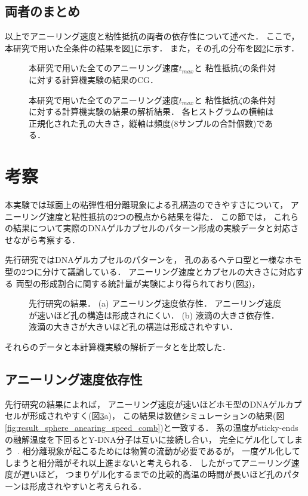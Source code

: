 \subsection{両者のまとめ}
以上でアニーリング速度と粘性抵抗の両者の依存性について述べた．
ここで，本研究で用いた全条件の結果を図\ref{fig:result_sphere_all}に示す．
また，その孔の分布を図\ref{fig:result_sphere_all_hist}に示す．
\begin{figure}
    \centering
    
    \caption{
        本研究で用いた全てのアニーリング速度$t_{max}$と
        粘性抵抗$\zeta$の条件対に対する計算機実験の結果のCG．
    }
\label{fig:result_sphere_all}
\end{figure}
\begin{figure}
    \centering
    
    \caption{
        本研究で用いた全てのアニーリング速度$t_{max}$と
        粘性抵抗$\zeta$の条件対に対する計算機実験の結果の解析結果．
        各ヒストグラムの横軸は正規化された孔の大きさ，縦軸は頻度(8サンプルの合計個数)である．
    }
    \label{fig:result_sphere_all_hist}
\end{figure}


\section{考察}
本実験では球面上の粘弾性相分離現象による孔構造のできやすさについて，
アニーリング速度と粘性抵抗の2つの観点から結果を得た．
この節では，
これらの結果について実際のDNAゲルカプセルのパターン形成の実験データと対応させながら考察する．

先行研究ではDNAゲルカプセルのパターンを，
孔のあるヘテロ型と一様なホモ型の2つに分けて議論している．
アニーリング速度とカプセルの大きさに対応する
両型の形成割合に関する統計量が実験により得られており(図\ref{fig:result_moritasan})，
\begin{figure}
    \centering
    
    \caption{
        先行研究の結果\cite{moritasan}．
        (a) アニーリング速度依存性．
            アニーリング速度が速いほど孔の構造は形成されにくい．
        (b) 液滴の大きさ依存性．
            液滴の大きさが大きいほど孔の構造は形成されやすい．
    }
    \label{fig:result_moritasan}
\end{figure}
それらのデータと本計算機実験の解析データとを比較した．


\subsection{アニーリング速度依存性}
先行研究の結果によれば，
アニーリング速度が速いほどホモ型のDNAゲルカプセルが形成されやすく(図\ref{fig:result_moritasan}a)，
この結果は数値シミュレーションの結果(図\ref{fig:result_sphere_anearing_speed_comb})と一致する．
系の温度がsticky-endsの融解温度を下回るとY-DNA分子は互いに接続し合い，
完全にゲル化してしまう~\cite{sato2019sequence}.
相分離現象が起こるためには物質の流動が必要であるが，
一度ゲル化してしまうと相分離がそれ以上進まないと考えられる．
したがってアニーリング速度が遅いほど，
つまりゲル化するまでの比較的高温の時間が長いほど孔のパターンは形成されやすいと考えられる．

